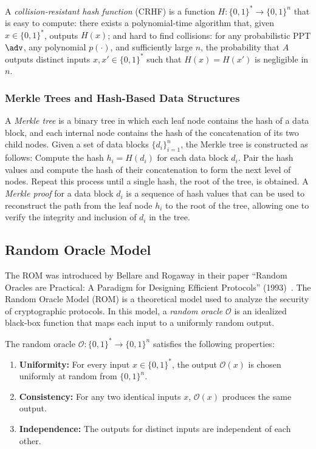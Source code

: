 \documentclass{iacrcc}
\begin{document}
\begin{definition}
A \textit{collision-resistant hash function} (CRHF) is a function $H: \{0, 1\}^* \to \{0, 1\}^n$ that is easy to compute: there exists a polynomial-time algorithm that, given $x \in \{0, 1\}^*$, outputs $H(x)$; and hard to find collisions: for any probabilistic PPT $\adv$, any polynomial $p(\cdot)$, and sufficiently large $n$, the probability that $A$ outputs distinct inputs $x, x' \in \{0, 1\}^*$ such that $H(x) = H(x')$ is negligible in $n$.
\end{definition}

\subsubsection{Merkle Trees and Hash-Based Data Structures}

\begin{definition}
A \textit{Merkle tree} is a binary tree in which each leaf node contains the hash of a data block, and each internal node contains the hash of the concatenation of its two child nodes. Given a set of data blocks $\{d_i\}_{i=1}^n$, the Merkle tree is constructed as follows: Compute the hash $h_i = H(d_i)$ for each data block $d_i$. Pair the hash values and compute the hash of their concatenation to form the next level of nodes. Repeat this process until a single hash, the root of the tree, is obtained. A \textit{Merkle proof} for a data block $d_i$ is a sequence of hash values that can be used to reconstruct the path from the leaf node $h_i$ to the root of the tree, allowing one to verify the integrity and inclusion of $d_i$ in the tree.
\end{definition}

\subsection{Random Oracle Model}

The ROM was introduced by Bellare and Rogaway in their paper ``Random Oracles are Practical: A Paradigm for Designing Efficient Protocols'' (1993)~\cite{CCS:BelRog93}. The Random Oracle Model (ROM) is a theoretical model used to analyze the security of cryptographic protocols. In this model, a \textit{random oracle} $\mathcal{O}$ is an idealized black-box function that maps each input to a uniformly random output.

\begin{definition}
The random oracle $\mathcal{O}: \{0,1\}^* \to \{0,1\}^n$ satisfies the following properties:
\begin{enumerate}
\item \textbf{Uniformity:} For every input $x \in \{0,1\}^*$, the output $\mathcal{O}(x)$ is chosen uniformly at random from $\{0,1\}^n$.
\item \textbf{Consistency:} For any two identical inputs $x$, $\mathcal{O}(x)$ produces the same output.
\item \textbf{Independence:} The outputs for distinct inputs are independent of each other.
\end{enumerate}
\end{definition}
\end{document}

